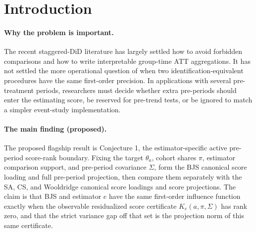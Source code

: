 \documentclass[11pt]{article}
\theoremstyle{definition}
\theoremstyle{plain}
\theoremstyle{remark}
\begin{document}
\begin{abstract}
Modern staggered DiD estimators often agree on the group-time ATT target while
using different pre-period information to remove untreated-outcome nuisance
variation.  This proposal asks for the sharp boundary at which additional
pre-treatment periods change the efficient influence function rather than
serving only as diagnostics or finite-sample stabilizers.  The flagship
conjecture is an estimator-specific active-score-rank theorem: after separating
canonical post-period score-loading differences from residual pre-period
projection differences, the BJS full-preperiod influence function equals that
estimator's influence function if and only if the corresponding observable
two-block score certificate \(K_e=(D_e;H_{\mathrm{pre},e})\) has rank zero.
Off this rank-zero set, the variance gap is the squared \(\Sigma^{-1}\)-norm
of the full score residual within the maintained sequential-moment model, so
efficiency loss is a computable projection quantity rather than a vague
estimator-choice warning.  A companion comparison theorem maps this diagnostic
to the extra pre-period weight component in \citet{ChenSantAnnaXie2025}.
Resolving the conjecture would turn the recent efficient-DiD literature into a
diagnostic for when empirical researchers should exploit all pre-periods in an
imputation score.
\end{abstract}

\section{Introduction}
\paragraph{Why the problem is important.}
The recent staggered-DiD literature has largely settled how to avoid forbidden
comparisons and how to write interpretable group-time ATT aggregations.  It has
not settled the more operational question of when two identification-equivalent
procedures have the same first-order precision.  In applications with several
pre-treatment periods, researchers must decide whether extra pre-periods should
enter the estimating score, be reserved for pre-trend tests, or be ignored to
match a simpler event-study implementation.

\paragraph{The main finding (proposed).}
The proposed flagship result is Conjecture 1, the estimator-specific active
pre-period score-rank boundary.  Fixing the target \(\theta_a\), cohort shares
\(\pi\), estimator comparison support, and pre-period covariance \(\Sigma\),
form the BJS canonical score loading and full pre-period projection, then
compare them separately with the SA, CS, and Wooldridge canonical score
loadings and score projections.  The claim is that BJS and estimator \(e\)
have the same first-order influence function exactly when the observable
residualized score certificate \(K_e(a,\pi,\Sigma)\) has rank zero, and that
the strict variance gap off that set is the projection norm of this same
certificate.
\end{document}
